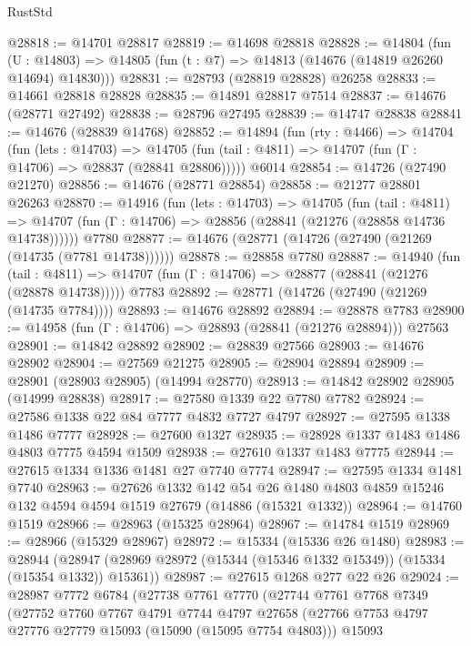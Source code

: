 \begin{lexlean}{RustStd}
\begin{coremodule}
@28818 := @14701 @28817
@28819 := @14698 @28818
@28828 := @14804
    (fun (U : @14803) => @14805 (fun (t : @7) => @14813 (@14676 (@14819 @26260 @14694) @14830)))
@28831 := @28793 (@28819 @28828) @26258
@28833 := @14661 @28818 @28828
@28835 := @14891 @28817 @7514
@28837 := @14676 (@28771 @27492)
@28838 := @28796 @27495
@28839 := @14747 @28838
@28841 := @14676 (@28839 @14768)
@28852 := @14894
    (fun (rty : @4466) =>
    @14704
      (fun (lets : @14703) =>
      @14705 (fun (tail : @4811) => @14707 (fun (Γ : @14706) => @28837 (@28841 @28806)))))
    @6014
@28854 := @14726 (@27490 @21270)
@28856 := @14676 (@28771 @28854)
@28858 := @21277 @28801 @26263
@28870 := @14916
    (fun (lets : @14703) =>
    @14705
      (fun (tail : @4811) =>
      @14707 (fun (Γ : @14706) => @28856 (@28841 (@21276 (@28858 @14736 @14738))))))
    @7780
@28877 := @14676 (@28771 (@14726 (@27490 (@21269 (@14735 (@7781 @14738))))))
@28878 := @28858 @7780
@28887 := @14940
    (fun (tail : @4811) => @14707 (fun (Γ : @14706) => @28877 (@28841 (@21276 (@28878 @14738)))))
    @7783
@28892 := @28771 (@14726 (@27490 (@21269 (@14735 @7784))))
@28893 := @14676 @28892
@28894 := @28878 @7783
@28900 := @14958 (fun (Γ : @14706) => @28893 (@28841 (@21276 @28894))) @27563
@28901 := @14842 @28892
@28902 := @28839 @27566
@28903 := @14676 @28902
@28904 := @27569 @21275
@28905 := @28904 @28894
@28909 := @28901 (@28903 @28905) (@14994 @28770)
@28913 := @14842 @28902 @28905 (@14999 @28838)
@28917 := @27580 @1339 @22 @7780 @7782
@28924 := @27586 @1338 @22 @84 @7777 @4832 @7727 @4797
@28927 := @27595 @1338 @1486 @7777
@28928 := @27600 @1327
@28935 := @28928 @1337 @1483 @1486 @4803 @7775 @4594 @1509
@28938 := @27610 @1337 @1483 @7775
@28944 := @27615 @1334 @1336 @1481 @27 @7740 @7774
@28947 := @27595 @1334 @1481 @7740
@28963 := @27626
    @1332
    @142
    @54
    @26
    @1480
    @4803
    @4859
    @15246
    @132
    @4594
    @4594
    @1519
    @27679
    (@14886 (@15321 @1332))
@28964 := @14760 @1519
@28966 := @28963 (@15325 @28964)
@28967 := @14784 @1519
@28969 := @28966 (@15329 @28967)
@28972 := @15334 (@15336 @26 @1480)
@28983 := @28944
    (@28947 (@28969 @28972 (@15344 (@15346 @1332 @15349)) (@15334 (@15354 @1332)) @15361))
@28987 := @27615 @1268 @277 @22 @26
@29024 := @28987
    @7772
    @6784
    (@27738
      @7761
      @7770
      (@27744
        @7761
        @7768
        @7349
        (@27752
          @7760
          @7767
          @4791
          @7744
          @4797
          @27658
          (@27766 @7753 @4797 @27776 @27779 @15093 (@15090 (@15095 @7754 @4803)))
          @15093

\end{coremodule}
\end{lexlean}
